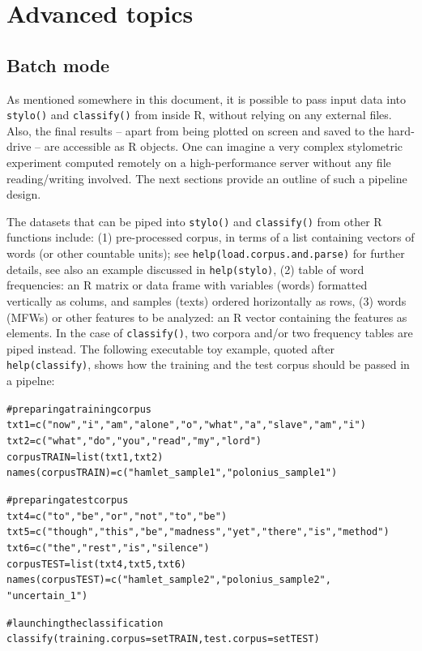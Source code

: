 \documentclass[11pt,a4paper]{article}
\def\code#1{{\tt #1}}
\begin{document}
\section{Advanced topics}





\subsection{Batch mode}

As mentioned somewhere in this document, it is possible to pass input data into \code{stylo()} and \code{classify()} from inside R, without relying on any external files. Also, the final results -- apart from being plotted on screen and saved to the hard-drive -- are accessible as R objects. One can imagine a very complex stylometric experiment computed remotely on a high-performance server without any file reading/writing involved. The next sections provide an outline of such a pipeline design.

The datasets that can be piped into \code{stylo()} and \code{classify()} from other R functions include: (1) pre-processed corpus, in terms of a list containing vectors of words (or other countable units); see \code{help(load.corpus.and.parse)} for further details, see also an example discussed in \code{help(stylo)}, (2) table of word frequencies: an R matrix or data frame with variables (words) formatted vertically as colums, and samples (texts) ordered horizontally as rows, (3) words (MFWs) or other features to be analyzed: an R vector containing the features as elements. In the case of \code{classify()}, two corpora and/or two frequency tables are piped instead. The following executable toy example, quoted after \code{help(classify)}, shows how the training and the test corpus should be passed in a pipelne:

\begin{alltt}
     # preparing a training corpus
     txt1 = c("now", "i", "am", "alone", "o", "what", "a", "slave", "am", "i")
     txt2 = c("what", "do", "you", "read", "my", "lord")
       corpusTRAIN = list(txt1, txt2)
       names(corpusTRAIN) = c("hamlet_sample1", "polonius_sample1")

     # preparing a test corpus
     txt4 = c("to", "be", "or", "not", "to", "be")
     txt5 = c("though", "this", "be", "madness", "yet", "there", "is", "method")
     txt6 = c("the", "rest", "is", "silence")
       corpusTEST = list(txt4, txt5, txt6)
       names(corpusTEST) = c("hamlet_sample2", "polonius_sample2", 
                                                       "uncertain_1")

     # launching the classification
     classify(training.corpus = setTRAIN, test.corpus = setTEST)
\end{alltt}
\end{document}

